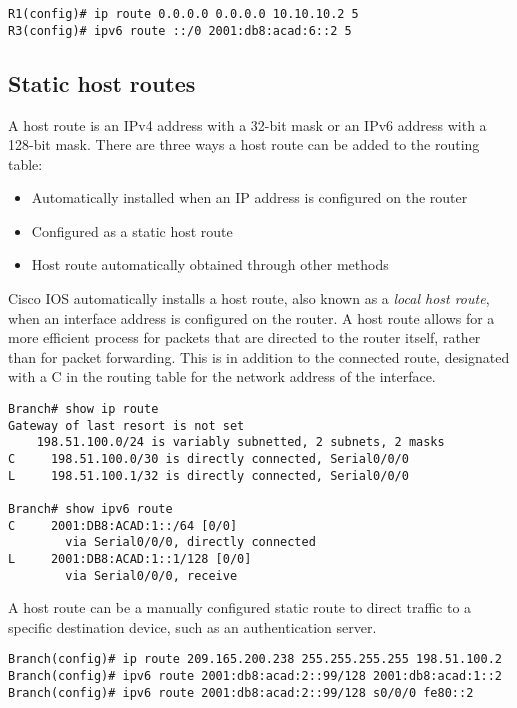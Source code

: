 \begin{verbatim}
R1(config)# ip route 0.0.0.0 0.0.0.0 10.10.10.2 5
R3(config)# ipv6 route ::/0 2001:db8:acad:6::2 5
\end{verbatim}

\subsection{Static host routes}

A host route is an IPv4 address with a 32-bit mask or an IPv6 address with a 128-bit mask. There are three ways a host route can be added to the routing table:

\begin{itemize}
\item Automatically installed when an IP address is configured on the router
\item Configured as a static host route
\item Host route automatically obtained through other methods
\end{itemize}

Cisco IOS automatically installs a host route, also known as a \emph{local host route}, when an interface address is configured on the router. A host route allows for a more efficient process for packets that are directed to the router itself, rather than for packet forwarding. This is in addition to the connected route, designated with a C in the routing table for the network address of the interface.

\begin{verbatim}
Branch# show ip route
Gateway of last resort is not set
    198.51.100.0/24 is variably subnetted, 2 subnets, 2 masks
C     198.51.100.0/30 is directly connected, Serial0/0/0
L     198.51.100.1/32 is directly connected, Serial0/0/0

Branch# show ipv6 route
C     2001:DB8:ACAD:1::/64 [0/0]
        via Serial0/0/0, directly connected
L     2001:DB8:ACAD:1::1/128 [0/0]
        via Serial0/0/0, receive
\end{verbatim}

A host route can be a manually configured static route to direct traffic to a specific destination device, such as an authentication server.

\begin{verbatim}
Branch(config)# ip route 209.165.200.238 255.255.255.255 198.51.100.2
Branch(config)# ipv6 route 2001:db8:acad:2::99/128 2001:db8:acad:1::2
Branch(config)# ipv6 route 2001:db8:acad:2::99/128 s0/0/0 fe80::2
\end{verbatim}